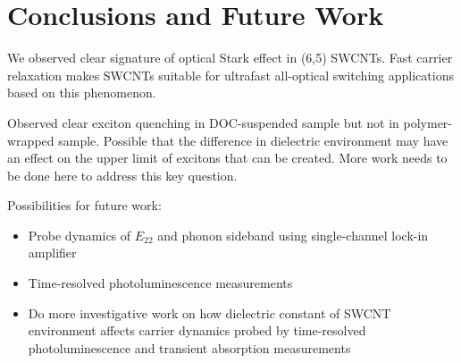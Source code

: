 \chapter{Conclusions and Future Work}

We observed clear signature of optical Stark effect in (6,5) SWCNTs. Fast carrier relaxation makes SWCNTs suitable for ultrafast all-optical switching applications based on this phenomenon.

Observed clear exciton quenching in DOC-suspended sample but not in polymer-wrapped sample. Possible that the difference in dielectric environment may have an effect on the upper limit of excitons that can be created. More work needs to be done here to address this key question.

Possibilities for future work:
\begin{itemize}
  \item Probe dynamics of $E_{22}$ and phonon sideband using single-channel lock-in amplifier
  \item Time-resolved photoluminescence measurements \cite{murakami2009existence}
  \item Do more investigative work on how dielectric constant of SWCNT environment affects carrier dynamics probed by time-resolved photoluminescence and transient absorption measurements
\end{itemize}
